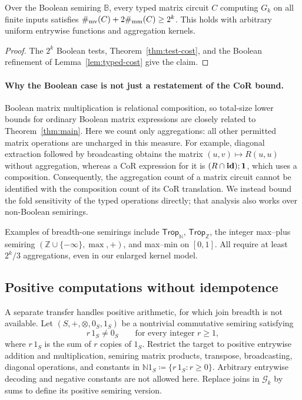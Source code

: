 \begin{theorem}\label{thm:boolean-matrix}
Over the Boolean semiring $\mathbb B$, every typed matrix circuit
$C$ computing $G_k$ on all finite inputs satisfies
$\#_{\mathrm{mv}}(C)+2\#_{\mathrm{mm}}(C)\ge2^k$.
This holds with arbitrary uniform entrywise functions and
aggregation kernels.
\end{theorem}
\begin{proof}
The $2^k$ Boolean tests, Theorem~\ref{thm:test-cost}, and the
Boolean refinement of Lemma~\ref{lem:typed-cost} give the claim.
\end{proof}

\paragraph{Why the Boolean case is not just a restatement of the CoR bound.}
Boolean matrix multiplication is relational composition, so total-size
lower bounds for ordinary Boolean matrix expressions are closely
related to Theorem~\ref{thm:main}. Here we count only aggregations:
all other permitted matrix operations are uncharged in this measure. For example,
diagonal extraction followed by broadcasting obtains the matrix
$(u,v)\mapsto R(u,u)$ without aggregation, whereas a CoR expression
for it is $(R\cap\mathbf{id});\mathbf{1}$, which uses a composition.
Consequently, the aggregation count of a matrix circuit cannot be
identified with the composition count of its CoR translation.
We instead bound the fold sensitivity of the typed operations directly;
that analysis also works over non-Boolean semirings.

Examples of breadth-one semirings include
$\mathsf{Trop}_{\mathbb N}$, $\mathsf{Trop}_{\mathbb Z}$,
the integer max--plus semiring
$(\mathbb Z\cup\{-\infty\},\max,+)$, and max--min on $[0,1]$.
All require at least $2^k/3$ aggregations, even in our enlarged
kernel model.

\subsection{Positive computations without idempotence}\label{sec:positive}
A separate transfer handles positive arithmetic, for which join breadth
is not available. Let $(S,+,\otimes,0_S,1_S)$ be a nontrivial commutative
semiring satisfying
\begin{equation*}\tag{NV}\label{eq:positive-characteristic}
 r\,1_S\ne0_S\qquad\text{for every integer }r\ge1,
\end{equation*}
where $r\,1_S$ is the sum of $r$ copies of $1_S$.
Restrict the target to positive entrywise addition and multiplication,
semiring matrix products, transpose, broadcasting, diagonal operations,
and constants in $\mathbb N1_S\coloneqq\{r\,1_S:r\ge0\}$.
Arbitrary entrywise decoding and negative constants are not allowed here.
Replace joins in $\mathcal G_k$ by sums to define its positive
semiring version.

